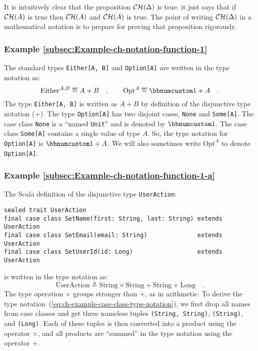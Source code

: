 It is intuitively clear that the proposition ${\cal CH}(\Delta)$
is true: it just says that if ${\cal CH}(A)$ is true then ${\cal CH}(A)$
and ${\cal CH}(A)$ is true. The point of writing ${\cal CH}(\Delta)$
in a mathematical notation is to prepare for proving that proposition
rigorously.

\subsubsection{Example \label{subsec:Example-ch-notation-function-1}\ref{subsec:Example-ch-notation-function-1}}

The standard types \lstinline!Either[A, B]! and \lstinline!Option[A]!
are written in the type notation as:
\[
\text{Either}^{A,B}\triangleq A+B\quad,\quad\quad\text{Opt}^{A}\triangleq\bbnum 1+A\quad.
\]
The type \lstinline!Either[A, B]! is written as $A+B$ by definition
of the disjunctive type notation ($+$). The type \lstinline!Option[A]!
has two disjoint cases, \lstinline!None! and \lstinline!Some[A]!.
The case class \lstinline!None! is a \textsf{``}named
\lstinline!Unit!\textsf{''} and is denoted by $\bbnum 1$. The case class
\lstinline!Some[A]! contains a single value of type $A$. So, the
type notation for \lstinline!Option[A]! is $\bbnum 1+A$. We will
also sometimes write $\text{Opt}^{A}$ to denote \lstinline!Option[A]!.

\subsubsection{Example \label{subsec:Example-ch-notation-function-1-a}\ref{subsec:Example-ch-notation-function-1-a}}

The Scala definition of the disjunctive type \lstinline!UserAction!:
\begin{lstlisting}
sealed trait UserAction
final case class SetName(first: String, last: String) extends UserAction
final case class SetEmail(email: String)              extends UserAction
final case class SetUserId(id: Long)                  extends UserAction
\end{lstlisting}
is written in the type notation as:
\begin{equation}
\text{UserAction}\triangleq\text{String}\times\text{String}+\text{String}+\text{Long}\quad.\label{eq:ch-example-case-class-type-notation}
\end{equation}
The type operation $\times$ groups stronger than $+$, as in arithmetic.
To derive the type notation~(\ref{eq:ch-example-case-class-type-notation}),
we first drop all names from case classes and get three nameless tuples
\lstinline!(String, String)!, \lstinline!(String)!, and \lstinline!(Long)!.
Each of these tuples is then converted into a product using the operator
$\times$, and all products are \textsf{``}summed\textsf{''} in the type notation
using the operator $+$.

